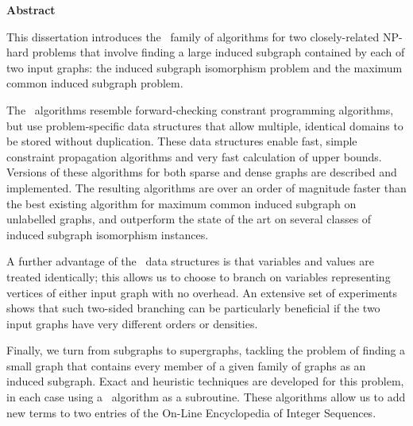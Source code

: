 \vspace*{1.75in}
\begin{center} {\bf Abstract}\end{center}

This dissertation introduces the \McSplit\ family of algorithms for
two closely-related NP-hard problems that involve finding a large
induced subgraph contained by each of two input graphs: the induced subgraph
isomorphism problem and the maximum common induced subgraph problem.

The \McSplit\ algorithms resemble forward-checking constrant programming
algorithms, but use problem-specific data structures that allow
multiple, identical domains to be stored without duplication.  These data structures
enable fast, simple constraint propagation algorithms and very fast calculation of
upper bounds.  Versions of these algorithms for both sparse and dense graphs are
described and implemented.
The resulting algorithms are over an order of magnitude faster
than the best existing algorithm for maximum common induced subgraph on unlabelled
graphs, and outperform the state of the art on several classes of induced subgraph
isomorphism instances.

A further advantage of the \McSplit\ data structures is that variables and
values are treated identically; this allows us to choose to branch on variables
representing vertices of either input graph with no overhead.  An extensive
set of experiments shows that such two-sided branching can be particularly
beneficial if the two input graphs have very different orders or densities.

Finally, we turn from subgraphs to supergraphs, tackling the problem of
finding a small graph that contains every member of a given family of graphs
as an induced subgraph.  Exact and heuristic techniques are developed for
this problem, in each case using a \McSplit\ algorithm as a subroutine.
These algorithms allow us to add new terms to two entries of the
On-Line Encyclopedia of Integer Sequences.
